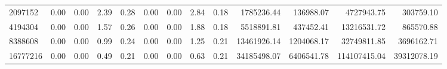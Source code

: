 \begin{tabular}{lrrrrrrrrrrrr}
2097152  &        0.00 &        0.00 &          2.39 &          0.28 &           0.00 &           0.00 &         2.84 &         0.18 &       1785236.44 &        136988.07 &      4727943.75 &       303759.10 \\
4194304  &        0.00 &        0.00 &          1.57 &          0.26 &           0.00 &           0.00 &         1.88 &         0.18 &       5518891.81 &        437452.41 &     13216531.72 &       865570.88 \\
8388608  &        0.00 &        0.00 &          0.99 &          0.24 &           0.00 &           0.00 &         1.25 &         0.21 &      13461926.14 &       1204068.17 &     32749811.85 &      3696162.71 \\
16777216 &        0.00 &        0.00 &          0.49 &          0.21 &           0.00 &           0.00 &         0.63 &         0.21 &      34185498.07 &       6406541.78 &    114107415.04 &     39312078.19 \\
\bottomrule
\end{tabular}
